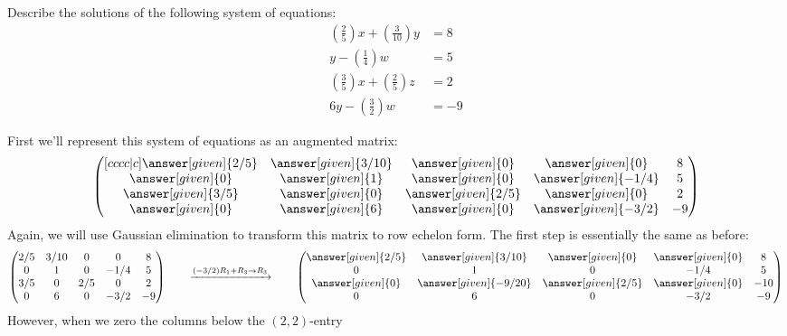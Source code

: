 \documentclass{ximera}
\begin{document}
\begin{example}[No solutions]
  Describe the solutions of the following system of equations:
  \begin{align*}
\left(\frac{2}{5}\right)x + \left(\frac{3}{10}\right) y &= 8\\
y -\left(\frac{1}{4}\right)w &= 5\\
\left(\frac{3}{5}\right)x + \left(\frac{2}{5}\right)z &= 2\\
6y - \left(\frac{3}{2}\right)w &= -9
\end{align*}
\begin{explanation}
First we'll represent this system of equations as an augmented matrix:
\[
  \begin{pmatrix}[cccc|c]
    \answer[given]{2/5}&  \answer[given]{3/10} & \answer[given]{0} &\answer[given]{0} &8 \\
    \answer[given]{0}&  \answer[given]{1} & \answer[given]{0} &\answer[given]{-1/4} & 5\\
    \answer[given]{3/5}&  \answer[given]{0} & \answer[given]{2/5} &\answer[given]{0} &2\\
    \answer[given]{0}&  \answer[given]{6} & \answer[given]{0} &\answer[given]{-3/2} &-9
  \end{pmatrix}
\]
Again, we will use Gaussian elimination to transform this matrix to
row echelon form. The first step is essentially the same as before:
\[
  \begin{pmatrix}
    {2/5}&  {3/10} & {0} &{0} &8 \\
    {0}&  {1} & {0} &{-1/4} & 5\\
    {3/5}&  {0} & {2/5} &{0} &2\\
    {0}&  {6} & {0} &{-3/2} &-9
  \end{pmatrix}
  \qquad\xrightarrow{(-3/2) R_1 + R_3\to R_3}\qquad
  \begin{pmatrix}
    \answer[given]{2/5}&  \answer[given]{3/10} & \answer[given]{0} &\answer[given]{0} &8 \\
    {0}&  {1} & {0} &{-1/4} & 5\\
    \answer[given]{0}&  \answer[given]{-9/20} & \answer[given]{2/5} &\answer[given]{0} &-10\\
    {0}&  {6} & {0} &{-3/2} &-9
  \end{pmatrix}
\]
However, when we zero the columns below the $(2,2)$-entry

\end{explanation}
\end{example}
\end{document}
